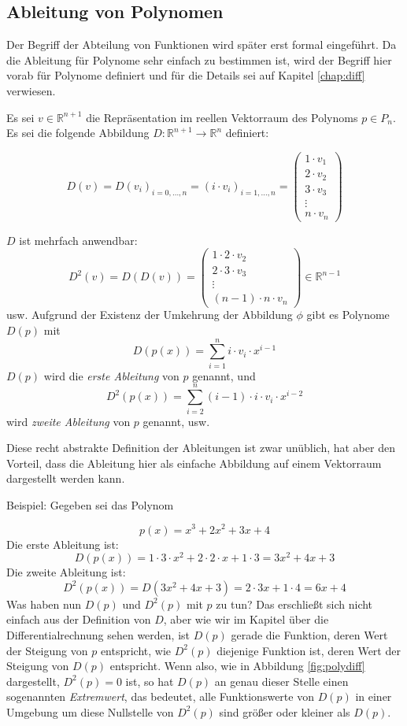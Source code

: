 \subsection{Ableitung von Polynomen}

Der Begriff der Abteilung von Funktionen wird später erst formal eingeführt. Da die Ableitung für Polynome sehr einfach zu bestimmen ist, wird der Begriff hier vorab für Polynome definiert und für die Details sei auf Kapitel \ref{chap:diff} verwiesen.

Es sei $v\in \mathbb{R}^{n+1}$ die Repräsentation im reellen Vektorraum des Polynoms $p\in P_n$. Es sei die folgende Abbildung $D: \mathbb{R}^{n+1} \longrightarrow \mathbb{R}^{n} $ definiert:

\begin{equation}
D(v) = D(v_i)_{i=0,\dots,n} = (i\cdot v_i)_{i=1,\dots,n}
= \begin{pmatrix}
1\cdot v_1 \\ 2\cdot v_2 \\ 3\cdot v_3 \\ \vdots \\ n\cdot v_n
\end{pmatrix}
\end{equation}

$D$ ist mehrfach anwendbar:
\[
D^2(v) = D(D(v)) = \begin{pmatrix}
1\cdot 2\cdot v_2 \\
2\cdot 3\cdot v_3 \\
\vdots \\
(n-1)\cdot n \cdot v_n
\end{pmatrix} \in \mathbb{R}^{n-1}
\]
usw. Aufgrund der Existenz der Umkehrung der Abbildung $\phi$ gibt es Polynome $D(p)$ mit 
\[
D(p(x)) = \sum_{i=1}^{n} i\cdot v_i \cdot x^{i-1}
\]
$D(p)$ wird die \textsl{erste Ableitung} von $p$ genannt, und
\[
D^2(p(x)) = \sum_{i=2}^{n} (i-1)\cdot i\cdot v_i \cdot x^{i-2}
\]
wird \textsl{zweite Ableitung} von $p$ genannt, usw.

Diese recht abstrakte Definition der Ableitungen ist zwar unüblich, hat aber den Vorteil, dass die Ableitung hier als einfache Abbildung auf einem Vektorraum dargestellt werden kann. 

Beispiel: Gegeben sei das Polynom 

\[
p(x) = x^3 + 2x^2 + 3x + 4
\]
Die erste Ableitung ist:
\[
D(p(x)) = 1\cdot 3\cdot x^2 + 2\cdot 2\cdot x + 1\cdot 3 = 3x^2 + 4x +3
\]
Die zweite Ableitung ist:
\[
D^2(p(x)) = D(3x^2 + 4x+3) = 2\cdot 3 x + 1\cdot 4 = 6x +4
\]
Was haben nun $D(p)$ und $D^2(p)$ mit $p$ zu tun? Das erschließt sich nicht einfach aus der Definition von $D$, aber wie wir im Kapitel über die Differentialrechnung sehen werden, ist $D(p)$ gerade die Funktion, deren Wert der Steigung von $p$ entspricht, wie $D^2(p)$ diejenige Funktion ist, deren Wert der Steigung von $D(p)$ entspricht. Wenn also, wie in Abbildung \ref{fig:polydiff} dargestellt, $D^2(p) = 0$ ist, so hat $D(p)$ an genau dieser Stelle einen sogenannten \textsl{Extremwert}, das bedeutet, alle Funktionswerte von $D(p)$ in einer Umgebung um diese Nullstelle von $D^2(p)$ sind größer oder kleiner als $D(p)$.


